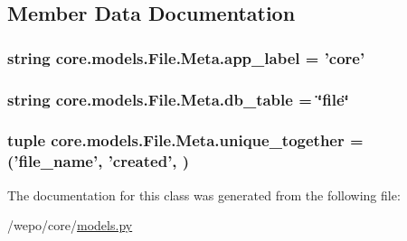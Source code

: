\subsection{Member Data Documentation}
\hypertarget{classcore_1_1models_1_1File_1_1Meta_aa438bad9ac4d8c2c33c8d82dee401064}{
\subsubsection[{app\-\_\-label}]{\setlength{\rightskip}{0pt plus 5cm}string core.\-models.\-File.\-Meta.\-app\-\_\-label = 'core'\hspace{0.3cm}{\ttfamily [static]}}}\label{classcore_1_1models_1_1File_1_1Meta_aa438bad9ac4d8c2c33c8d82dee401064}
\hypertarget{classcore_1_1models_1_1File_1_1Meta_a242437c37915a3c022ca1f98234c85c5}{
\subsubsection[{db\-\_\-table}]{\setlength{\rightskip}{0pt plus 5cm}string core.\-models.\-File.\-Meta.\-db\-\_\-table = \char`\"{}file\char`\"{}\hspace{0.3cm}{\ttfamily [static]}}}\label{classcore_1_1models_1_1File_1_1Meta_a242437c37915a3c022ca1f98234c85c5}
\hypertarget{classcore_1_1models_1_1File_1_1Meta_a332f99ae6fdafafc25e0c77e74803074}{
\subsubsection[{unique\-\_\-together}]{\setlength{\rightskip}{0pt plus 5cm}tuple core.\-models.\-File.\-Meta.\-unique\-\_\-together = ('{\bf file\-\_\-name}', '{\bf created}', )\hspace{0.3cm}{\ttfamily [static]}}}\label{classcore_1_1models_1_1File_1_1Meta_a332f99ae6fdafafc25e0c77e74803074}


The documentation for this class was generated from the following file\-:\begin{DoxyCompactItemize}
\item 
/wepo/core/\hyperlink{models_8py}{models.\-py}\end{DoxyCompactItemize}
